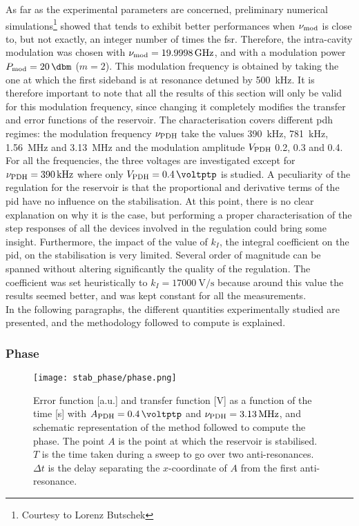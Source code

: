As far as the experimental parameters are concerned, preliminary numerical simulations\footnote{Courtesy to Lorenz Butschek} showed that \rcer tends to exhibit better performances when $\nu_{\text{mod}}$ is close to, but not exactly, an integer number of times the \gls{fsr}. Therefore, the intra-cavity modulation was chosen with $\nu_{\text{mod}} = \SI{19.9998}{\giga\hertz}$, and with a modulation power $\tind{P}{mod} = \SI{20}{\dbm}$ ($m=2$). This modulation frequency is obtained by taking the one at which the first sideband is at resonance detuned by \SI{500}{\kilo\hertz}. It is therefore important to note that all the results of this section will only be valid for this modulation frequency, since changing it completely modifies the transfer and error functions of the reservoir. The characterisation covers different \gls{pdh} regimes: the modulation frequency $\nu_{\text{PDH}}$ take the values \SI{390}{\kilo\hertz}, \SI{781}{\kilo\hertz}, \SI{1.56}{\mega\hertz} and \SI{3.13}{\mega\hertz} and the modulation amplitude $V_{\text{PDH}}$ \SI{0.2}{\voltptp}, \SI{0.3}{\voltptp} and \SI{0.4}{\voltptp}. For all the frequencies, the three voltages are investigated except for $\nu_{\text{PDH}} = \SI{390}{\kilo\hertz}$ where only $\tind{V}{PDH} = \SI{0.4}{\voltptp}$ is studied. A peculiarity of the regulation for the reservoir is that the proportional and derivative terms of the \gls{pid} have no influence on the stabilisation. At this point, there is no clear explanation on why it is the case, but performing a proper characterisation of the step responses of all the devices involved in the regulation could bring some insight. Furthermore, the impact of the value of $k_I$, the integral coefficient on the \gls{pid}, on the stabilisation is very limited. Several order of magnitude can be spanned without altering significantly the quality of the regulation. The coefficient was set heuristically to $k_I=\SI{17000}{\volt\per\second}$ because around this value the results seemed better, and was kept constant for all the measurements.\\

In the following paragraphs, the different quantities experimentally studied are presented, and the methodology followed to compute is explained.


\subsubsection{Phase}

\begin{figure}[h]
	\centering
	\texttt{[image: stab\_phase/phase.png]}
	\caption{Error function [a.u.] and transfer function [\si{\volt}] as a function of the time [\si{\second}] with $\tind{A}{PDH} = \SI{0.4}{\voltptp}$ and $\nu_{\text{PDH}} = \SI{3.13}{\mega\hertz}$, and schematic representation of the method followed to compute the phase. The point $A$ is the point at which the reservoir is stabilised. $T$ is the time taken during a sweep to go over two anti-resonances. $\Delta t$ is the delay separating the $x$-coordinate of $A$ from the first anti-resonance.}
	\label{phase}
\end{figure}

